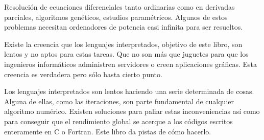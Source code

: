 Resolución de ecuaciones diferenciales tanto ordinarias como en
derivadas parciales, algoritmos genéticos, estudios paramétricos.
Algunos de estos problemas necesitan ordenadores de potencia casi
infinita para ser resueltos.

Existe la creencia que los lenguajes interpretados, objetivo de este
libro, son lentos y no aptos para estas tareas.  Que no son más que
juguetes para que los ingenieros informáticos administren servidores o
creen aplicaciones gráficas.  Esta creencia es verdadera pero sólo
hasta cierto punto.

Los lenguajes interpretados son lentos haciendo una serie determinada
de cosas.  Alguna de ellas, como las iteraciones, son parte
fundamental de cualquier algoritmo numérico.  Existen soluciones para
paliar estas inconveniencias así como para conseguir que el
rendimiento global se acerque a los códigos escritos enteramente en C
o Fortran.  Este libro da pistas de cómo hacerlo.
